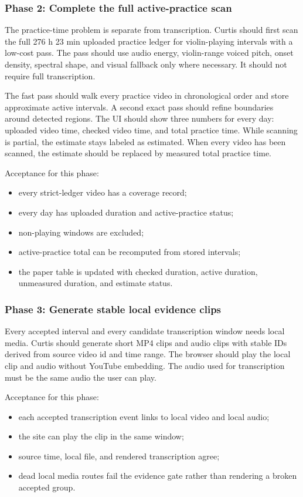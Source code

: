 \subsubsection*{Phase 2: Complete the full active-practice scan}

The practice-time problem is separate from transcription. Curtis should first scan the full 276 h 23 min uploaded practice ledger for violin-playing intervals with a low-cost pass. The pass should use audio energy, violin-range voiced pitch, onset density, spectral shape, and visual fallback only where necessary. It should not require full transcription.

The fast pass should walk every practice video in chronological order and store approximate active intervals. A second exact pass should refine boundaries around detected regions. The UI should show three numbers for every day: uploaded video time, checked video time, and total practice time. While scanning is partial, the estimate stays labeled as estimated. When every video has been scanned, the estimate should be replaced by measured total practice time.

Acceptance for this phase:
\begin{itemize}
    \item every strict-ledger video has a coverage record;
    \item every day has uploaded duration and active-practice status;
    \item non-playing windows are excluded;
    \item active-practice total can be recomputed from stored intervals;
    \item the paper table is updated with checked duration, active duration, unmeasured duration, and estimate status.
\end{itemize}

\subsubsection*{Phase 3: Generate stable local evidence clips}

Every accepted interval and every candidate transcription window needs local media. Curtis should generate short MP4 clips and audio clips with stable IDs derived from source video id and time range. The browser should play the local clip and audio without YouTube embedding. The audio used for transcription must be the same audio the user can play.

Acceptance for this phase:
\begin{itemize}
    \item each accepted transcription event links to local video and local audio;
    \item the site can play the clip in the same window;
    \item source time, local file, and rendered transcription agree;
    \item dead local media routes fail the evidence gate rather than rendering a broken accepted group.
\end{itemize}

